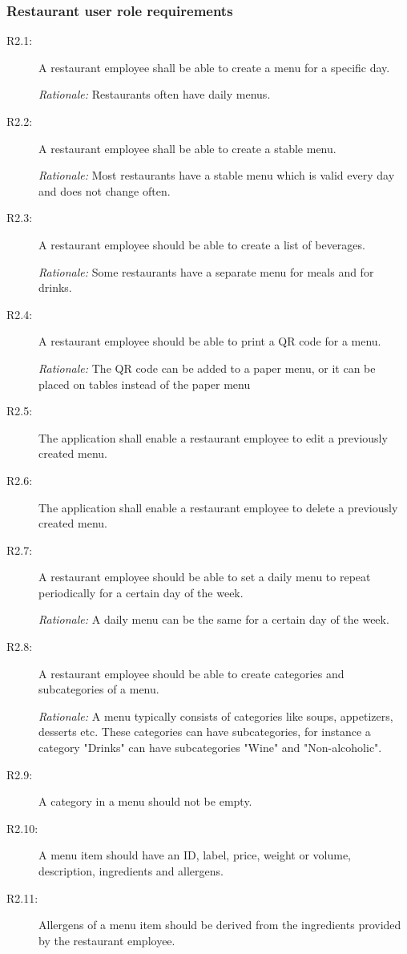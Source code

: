 \subsubsection{Restaurant user role requirements}
\begin{description}
    \item [R2.1:] A restaurant employee shall be able to create a menu for a specific day.

    \emph{Rationale:} Restaurants often have daily menus.
    \item [R2.2:] A restaurant employee shall be able to create a stable menu.

    \emph{Rationale:} Most restaurants have a stable menu which is valid every day and does not change often.
    \item [R2.3:] A restaurant employee should be able to create a list of beverages.

    \emph{Rationale:} Some restaurants have a separate menu for meals and for drinks.
    \item [R2.4:] A restaurant employee should be able to print a QR code for a menu.

    \emph{Rationale:} The QR code can be added to a paper menu, or it can be placed on tables instead of the paper menu
   
    \item [R2.5:] The application shall enable a restaurant employee to edit a previously created menu.
    \item [R2.6:] The application shall enable a restaurant employee to delete a previously created menu.
    \item [R2.7:] A restaurant employee should be able to set a daily menu to repeat periodically for a certain day of the week.

    \emph{Rationale:} A daily menu can be the same for a certain day of the week.
    \item [R2.8:] A restaurant employee should be able to create categories and subcategories of a menu.

    \emph{Rationale:} A menu typically consists of categories like soups, appetizers, desserts etc. These categories can have subcategories, for instance a category "Drinks" can have subcategories "Wine" and "Non-alcoholic".
    \item [R2.9:] A category in a menu should not be empty.   
    \item [R2.10:] A menu item should have an ID, label, price, weight or volume, description, ingredients and allergens.
    \item [R2.11:] Allergens of a menu item should be derived from the ingredients provided by the restaurant employee.


\end{description}

